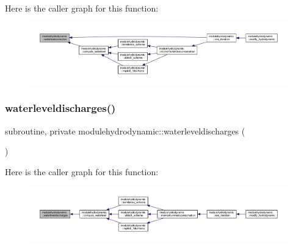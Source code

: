 Here is the caller graph for this function\+:\nopagebreak
\begin{figure}[H]
\begin{center}
\leavevmode
\includegraphics[width=350pt]{namespacemodulehydrodynamic_a1adc02badc9c5130d372cfb28e43f796_icgraph}
\end{center}
\end{figure}
\mbox{\label{namespacemodulehydrodynamic_a644daa49a5aa05490db0fd5dae3af00c}} 
\subsubsection{\texorpdfstring{waterleveldischarges()}{waterleveldischarges()}}
{\footnotesize\ttfamily subroutine, private modulehydrodynamic\+::waterleveldischarges (\begin{DoxyParamCaption}{ }\end{DoxyParamCaption})\hspace{0.3cm}{\ttfamily [private]}}

Here is the caller graph for this function\+:\nopagebreak
\begin{figure}[H]
\begin{center}
\leavevmode
\includegraphics[width=350pt]{namespacemodulehydrodynamic_a644daa49a5aa05490db0fd5dae3af00c_icgraph}
\end{center}
\end{figure}
\mbox{\label{namespacemodulehydrodynamic_a4c31b8fb87415bace90b12dd41376ef4}} 
